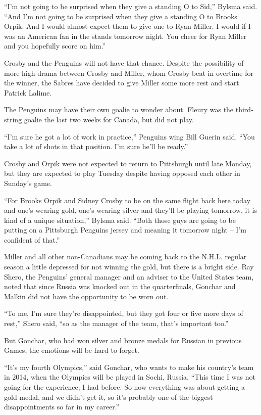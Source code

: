 ﻿\documentclass[12pt]{article}
\begin{document}
``I'm not going to be surprised when they give a standing O to Sid,'' Bylsma said. ``And I'm not
going to be surprised when they give a standing O to Brooks Orpik. And I would almost expect them to
give one to Ryan Miller. I would if I was an American fan in the stands tomorrow night. You cheer
for Ryan Miller and you hopefully score on him.''

Crosby and the Penguins will not have that chance. Despite the possibility of more high drama
between Crosby and Miller, whom Crosby beat in overtime for the winner, the Sabres have decided to
give Miller some more rest and start Patrick Lalime.

The Penguins may have their own goalie to wonder about. Fleury was the third-string goalie the last
two weeks for Canada, but did not play.

``I'm sure he got a lot of work in practice,'' Penguins wing Bill Guerin said. ``You take a lot of
shots in that position. I'm sure he'll be ready.''

Crosby and Orpik were not expected to return to Pittsburgh until late Monday, but they are expected
to play Tuesday despite having opposed each other in Sunday's game.

``For Brooks Orpik and Sidney Crosby to be on the same flight back here today and one's wearing
gold, one's wearing silver and they'll be playing tomorrow, it is kind of a unique situation,''
Bylsma said. ``Both those guys are going to be putting on a Pittsburgh Penguins jersey and meaning
it tomorrow night -- I'm confident of that.''

Miller and all other non-Canadians may be coming back to the N.H.L. regular season a little
depressed for not winning the gold, but there is a bright side. Ray Shero, the Penguins' general
manager and an adviser to the United States team, noted that since Russia was knocked out in the
quarterfinals, Gonchar and Malkin did not have the opportunity to be worn out.

``To me, I'm sure they're disappointed, but they got four or five more days of rest,'' Shero said,
``so as the manager of the team, that's important too.''

But Gonchar, who had won silver and bronze medals for Russian in previous Games, the emotions will
be hard to forget.

``It's my fourth Olympics,'' said Gonchar, who wants to make his country's team in 2014, when the
Olympics will be played in Sochi, Russia. ``This time I was not going for the experience; I had
before. So now everything was about getting a gold medal, and we didn't get it, so it's probably one
of the biggest disappointments so far in my career.''
\end{document}
